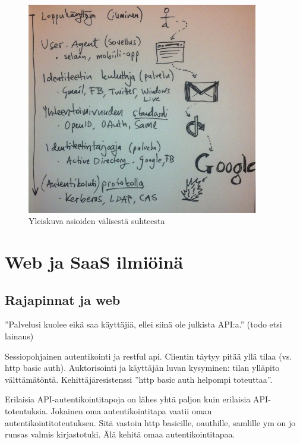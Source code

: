 \documentclass[finnish,gradu]{tktltiki}
\begin{document}
  \begin{figure}
    \centering
    \includegraphics[width=0.9\textwidth]{images/auth_yleiskuva.jpg}
    \caption{Yleiskuva asioiden välisestä suhteesta}
    \label{fig:yleiskuva}
  \end{figure}



\section{Web ja SaaS ilmiöinä} %
\label{sec:web_ja_saas}
  \subsection{Rajapinnat ja web} %
  \label{sub:rajapinnat_ja_web}

  ''Palvelusi kuolee eikä saa käyttäjiä, ellei siinä ole julkista API:a.'' (todo etsi lainaus)

  Sessiopohjainen autentikointi ja restful api. Clientin täytyy pitää yllä tilaa (vs. http basic auth).
  Auktorisointi ja käyttäjän luvan kysyminen: tilan ylläpito välttämätöntä. Kehittäjäresistenssi ''http basic auth helpompi toteuttaa''.

  Erilaisia API-autentikointitapoja on lähes yhtä paljon kuin erilaisia API-toteutuksia. Jokainen oma autentikointitapa vaatii oman autentikointitoteutuksen. Sitä vastoin http basicille, oauthille, samlille ym on jo runsas valmis kirjastotuki.  Älä kehitä omaa autentikointitapaa.
\end{document}
